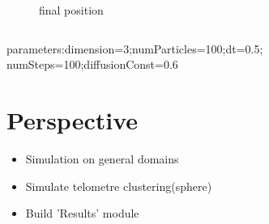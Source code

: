 \documentclass {beamer}
\begin{document}
\begin{frame}
\begin{columns}
\begin{column}{0.3\textwidth}
\begin{figure}
		\caption{final position}
		\end{figure}		
		\end{column}
		\end{columns}
		parameters:dimension=3;numParticles=100;dt=0.5;\\numSteps=100;diffusionConst=0.6
		\end{frame}
\section{Perspective}		 
		 \begin{frame}
		 \begin{itemize}
		 \item Simulation on general domains
		 \item Simulate telometre clustering(sphere)
		 \item Build 'Results' module
		 \end{itemize}
		 \end{frame}
\end{document}
